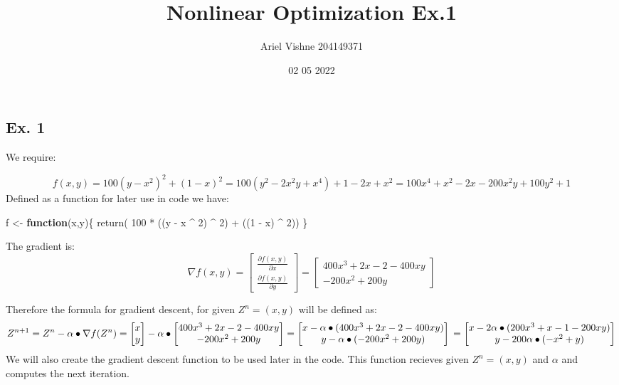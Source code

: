 \documentclass[
]{article}
\title{Nonlinear Optimization Ex.1}
\author{Ariel Vishne 204149371}
\date{02 05 2022}
\newenvironment{Shaded}{\begin{snugshade}}{\end{snugshade}}
\newcommand{\ControlFlowTok}[1]{\textcolor[rgb]{0.13,0.29,0.53}{\textbf{#1}}}
\newcommand{\DecValTok}[1]{\textcolor[rgb]{0.00,0.00,0.81}{#1}}
\newcommand{\FunctionTok}[1]{\textcolor[rgb]{0.00,0.00,0.00}{#1}}
\newcommand{\NormalTok}[1]{#1}
\newcommand{\OtherTok}[1]{\textcolor[rgb]{0.56,0.35,0.01}{#1}}
\newcommand{\SpecialCharTok}[1]{\textcolor[rgb]{0.00,0.00,0.00}{#1}}
\begin{document}
\maketitle

\hypertarget{ex.-1}{%
\subsection{Ex. 1}\label{ex.-1}}

We require:

\[
f(x,y) = 100(y-x^2)^2+(1-x)^2 = 100(y^2-2x^2y+x^4) + 1-2x+x^2= 100x^4+x^2-2x-200x^2y+100y^2+1
\] Defined as a function for later use in code we have:

\begin{Shaded}
\begin{Highlighting}[]
\NormalTok{f }\OtherTok{\textless{}{-}} \ControlFlowTok{function}\NormalTok{(x,y)\{}
 \FunctionTok{return}\NormalTok{( }\DecValTok{100} \SpecialCharTok{*}\NormalTok{ ((y }\SpecialCharTok{{-}}\NormalTok{ x }\SpecialCharTok{\^{}} \DecValTok{2}\NormalTok{) }\SpecialCharTok{\^{}} \DecValTok{2}\NormalTok{) }\SpecialCharTok{+}\NormalTok{ ((}\DecValTok{1} \SpecialCharTok{{-}}\NormalTok{ x) }\SpecialCharTok{\^{}} \DecValTok{2}\NormalTok{)) }
\NormalTok{\}}
\end{Highlighting}
\end{Shaded}

The gradient is: \[
\nabla f(x,y)= \begin{bmatrix} \frac{\partial f(x,y)}{\partial x} \\ \frac{\partial f(x,y)}{\partial y} \end{bmatrix} = \begin{bmatrix} 400x^3+2x-2-400xy \\ -200x^2+200y \end{bmatrix}
\]

Therefore the formula for gradient descent, for given \(Z^{n}=(x,y)\)
will be defined as: \[
Z^{n+1} = Z^{n} - \alpha \bullet \nabla f(Z^{n})=\begin{bmatrix} x \\ y \end{bmatrix} - \alpha \bullet \begin{bmatrix} 400x^3+2x-2-400xy \\ -200x^2+200y \end{bmatrix}=\begin{bmatrix} x - \alpha\bullet (400x^3+2x-2-400xy) \\ y-\alpha \bullet (-200x^2+200y) \end{bmatrix}\\ =\begin{bmatrix} x - 2\alpha\bullet (200x^3+x-1-200xy) \\ y-200\alpha \bullet (-x^2+y) \end{bmatrix}
\] We will also create the gradient descent function to be used later in
the code. This function recieves given \(Z^{n} = (x,y)\) and \(\alpha\)
and computes the next iteration.
\end{document}
